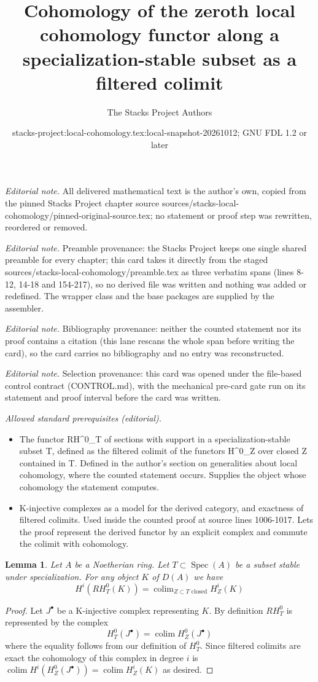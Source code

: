 \documentclass[10pt,a4paper]{amsart}
\title{Cohomology of the zeroth local cohomology functor along a specialization-stable subset as a filtered colimit}
\author{The Stacks Project Authors}
\date{stacks-project:local-cohomology.tex:local-snapshot-20261012; GNU FDL 1.2 or later}
\theoremstyle{plain}
\newtheorem{lemma}[subsection]{Lemma}
\theoremstyle{definition}
\theoremstyle{remark}
\numberwithin{equation}{subsection}
\def\colim{\mathop{\mathrm{colim}}\nolimits}
\def\Spec{\mathop{\mathrm{Spec}}}
\begin{document}
\maketitle
\noindent\textit{Editorial note.} All delivered mathematical text is the author's own, copied from the pinned Stacks Project chapter source sources/stacks-local-cohomology/pinned-original-source.tex; no statement or proof step was rewritten, reordered or removed.\par\medskip
\noindent\textit{Editorial note.} Preamble provenance: the Stacks Project keeps one single shared preamble for every chapter; this card takes it directly from the staged sources/stacks-local-cohomology/preamble.tex as three verbatim spans (lines 8-12, 14-18 and 154-217), so no derived file was written and nothing was added or redefined. The wrapper class and the base packages are supplied by the assembler.\par\medskip
\noindent\textit{Editorial note.} Bibliography provenance: neither the counted statement nor its proof contains a citation (this lane rescans the whole span before writing the card), so the card carries no bibliography and no entry was reconstructed.\par\medskip
\noindent\textit{Editorial note.} Selection provenance: this card was opened under the file-based control contract (CONTROL.md), with the mechanical pre-card gate run on its statement and proof interval before the card was written.\par\medskip
\noindent\textit{Allowed standard prerequisites (editorial).}\begin{itemize}
\item The functor RH\textasciicircum{}0\_T of sections with support in a specialization-stable subset T, defined as the filtered colimit of the functors H\textasciicircum{}0\_Z over closed Z contained in T. Defined in the author's section on generalities about local cohomology, where the counted statement occurs. Supplies the object whose cohomology the statement computes.
\item K-injective complexes as a model for the derived category, and exactness of filtered colimits. Used inside the counted proof at source lines 1006-1017. Lets the proof represent the derived functor by an explicit complex and commute the colimit with cohomology.
\end{itemize}\medskip
\begin{lemma}
\label{lemma-adjoint-ext}
Let $A$ be a Noetherian ring. Let $T \subset \Spec(A)$
be a subset stable under specialization.
For any object $K$ of $D(A)$ we have
$$
H^i(RH^0_T(K)) = \colim_{Z \subset T\text{ closed}} H^i_Z(K)
$$
\end{lemma}

\begin{proof}
Let $J^\bullet$ be a K-injective complex representing $K$.
By definition $RH^0_T$ is represented by the complex
$$
H^0_T(J^\bullet) = \colim H^0_Z(J^\bullet)
$$
where the equality follows from our definition of $H^0_T$.
Since filtered colimits are exact the cohomology of this
complex in degree $i$ is
$\colim H^i(H^0_Z(J^\bullet)) = \colim H^i_Z(K)$
as desired.
\end{proof}
\end{document}
